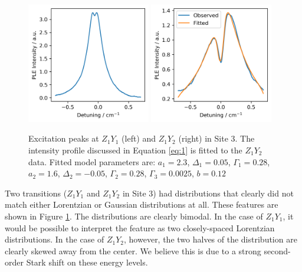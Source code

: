 \documentclass[12pt]{puthesis}
\begin{document}
\begin{figure}[b]
  \centering
  \includegraphics[width=0.48\textwidth]{Site3_y1}
  \includegraphics[width=0.48\textwidth]{Site3_y2}
  \caption{Excitation peaks at $Z_1Y_1$ (left) and $Z_1Y_2$ (right) in Site 3. The intensity profile discussed in Equation \eqref{eq:1} is fitted to the $Z_{1}Y_{2}$ data. Fitted model parameters are: $a_{1} = 2.3$, $\Delta_{1} = 0.05$, $\Gamma_{1} = 0.28$, $a_{2} = 1.6$, $\Delta_{2} = -0.05$, $\Gamma_{2} = 0.28$, $\Gamma_{3} = 0.0025$, $b = 0.12$}
  \label{fig:site3peaks}
\end{figure}

Two transitions ($Z_{1}Y_{1}$ and $Z_{1}Y_{2}$ in Site 3) had distributions that clearly did not match either Lorentzian or Gaussian distributions at all. These features are shown in Figure \ref{fig:site3peaks}. The distributions are clearly bimodal. In the case of $Z_{1}Y_{1}$, it would be possible to interpret the feature as two closely-spaced Lorentzian distributions. In the case of $Z_{1}Y_{2}$, however, the two halves of the distribution are clearly skewed away from the center. We believe this is due to a strong second-order Stark shift on these energy levels. 
\end{document}
